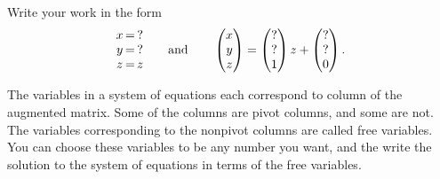 \begin{problem}
\begin{enumerate}
Write your work in the form 
$$
 \begin{matrix} x\\y\\z \end{matrix}\,\begin{matrix} =\\=\\= \end{matrix}\,\begin{matrix} ? \\ ? \\ z \end{matrix}
\quad \quad \text{and}\quad \quad 
 \begin{pmatrix} x\\y\\z \end{pmatrix}=\begin{pmatrix} ? \\ ? \\ 1 \end{pmatrix}z+\begin{pmatrix} ?\\?\\0 \end{pmatrix}.
$$
 
\end{enumerate}

\end{problem}

\begin{definition}
 The variables in a system of equations each correspond to column of the augmented matrix. Some of the columns are pivot columns, and some are not.  The variables corresponding to the nonpivot columns are called free variables.  You can choose these variables to be any number you want, and the write the solution to the system of equations in terms of the free variables. 
\end{definition}

